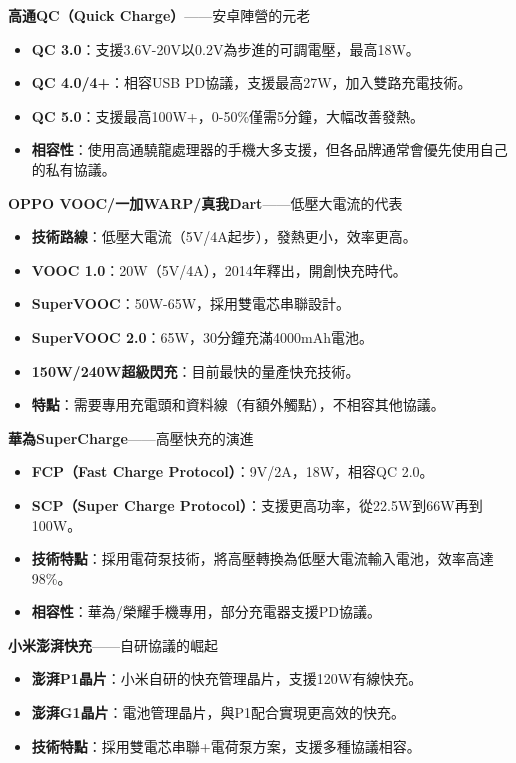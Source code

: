 \textbf{高通QC（Quick Charge）}——安卓陣營的元老

\begin{itemize}
  \item \textbf{QC 3.0}：支援3.6V-20V以0.2V為步進的可調電壓，最高18W。
  \item \textbf{QC 4.0/4+}：相容USB PD協議，支援最高27W，加入雙路充電技術。
  \item \textbf{QC 5.0}：支援最高100W+，0-50\%僅需5分鐘，大幅改善發熱。
  \item \textbf{相容性}：使用高通驍龍處理器的手機大多支援，但各品牌通常會優先使用自己的私有協議。
\end{itemize}

\textbf{OPPO VOOC/一加WARP/真我Dart}——低壓大電流的代表

\begin{itemize}
  \item \textbf{技術路線}：低壓大電流（5V/4A起步），發熱更小，效率更高。
  \item \textbf{VOOC 1.0}：20W（5V/4A），2014年釋出，開創快充時代。
  \item \textbf{SuperVOOC}：50W-65W，採用雙電芯串聯設計。
  \item \textbf{SuperVOOC 2.0}：65W，30分鐘充滿4000mAh電池。
  \item \textbf{150W/240W超級閃充}：目前最快的量產快充技術。
  \item \textbf{特點}：需要專用充電頭和資料線（有額外觸點），不相容其他協議。
\end{itemize}

\textbf{華為SuperCharge}——高壓快充的演進

\begin{itemize}
  \item \textbf{FCP（Fast Charge Protocol）}：9V/2A，18W，相容QC 2.0。
  \item \textbf{SCP（Super Charge Protocol）}：支援更高功率，從22.5W到66W再到100W。
  \item \textbf{技術特點}：採用電荷泵技術，將高壓轉換為低壓大電流輸入電池，效率高達98\%。
  \item \textbf{相容性}：華為/榮耀手機專用，部分充電器支援PD協議。
\end{itemize}

\textbf{小米澎湃快充}——自研協議的崛起

\begin{itemize}
  \item \textbf{澎湃P1晶片}：小米自研的快充管理晶片，支援120W有線快充。
  \item \textbf{澎湃G1晶片}：電池管理晶片，與P1配合實現更高效的快充。
  \item \textbf{技術特點}：採用雙電芯串聯+電荷泵方案，支援多種協議相容。
\end{itemize}

